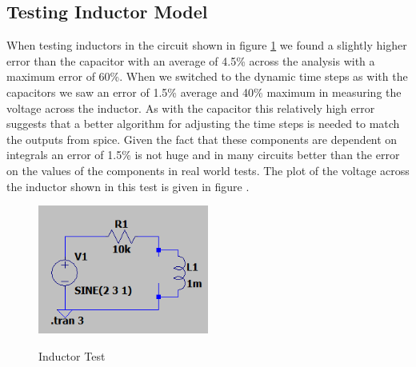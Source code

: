 \documentclass{article}
\begin{document}
\subsection{Testing Inductor Model}
When testing inductors in the circuit shown in figure \ref{fig:InductorTest1} we found a slightly higher error than the capacitor with an average of 4.5\% across the analysis with a maximum error of 60\%. When we switched to the dynamic time steps as with the capacitors we saw an error of 1.5\% average and 40\% maximum in measuring the voltage across the inductor. As with the capacitor this relatively high error suggests that a better algorithm for adjusting the time steps is needed to match the outputs from spice. Given the fact that these components are dependent on integrals an error of 1.5\% is not huge and in many circuits better than the error on the values of the components in real world tests. The plot of the voltage across the inductor shown in this test is given in figure .
\begin{figure}[h]
    \caption{Inductor Test}
    \centering
    \includegraphics[width=0.5\textwidth]{images/InductorTest1.png}
    \label{fig:InductorTest1}
\end{figure}
\end{document}
